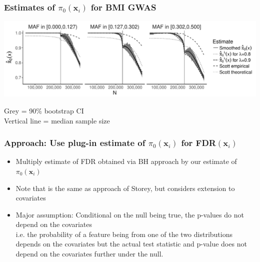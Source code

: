 \documentclass{beamer}
\newcommand{\bx}{\mathbf{x}}
\begin{document}
\begin{frame}
\frametitle{Estimates of $\pi_0(\bx_i)$ for BMI GWAS}

\begin{center}
\includegraphics[scale=0.48]{Fig2-1.pdf} 
\end{center}

Grey = 90\% bootstrap CI \\
Vertical line = median sample size

\end{frame}


\begin{frame}
\frametitle{Approach: Use plug-in estimate of $\pi_0(\bx_i)$ for FDR$(\bx_i)$}

\begin{itemize}
\item Multiply estimate of FDR obtained via BH approach by our estimate of $\pi_0(\bx_i)$

\item Note that is the same as approach of Storey, but considers extension to covariates

\item Major assumption: Conditional on the null being true, the p-values do not depend on the covariates\\ \vspace{0.2cm}
i.e. the probability of a feature being from one of the two distributions depends on the covariates but the actual test statistic and p-value
does not depend on the covariates further under the null.
\end{itemize}

\end{frame}

\end{document}
